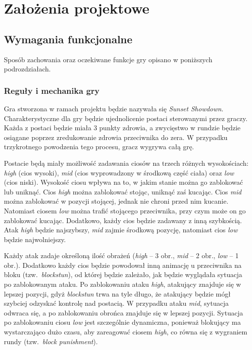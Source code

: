 \chapter{Założenia projektowe}
\section{Wymagania funkcjonalne}
Sposób zachowania oraz oczekiwane funkcje gry opisano w poniższych podrozdziałach.
\subsection{Reguły i mechanika gry}
Gra stworzona w ramach projektu będzie nazywała się \emph{Sunset Showdown}. Charakterystyczne dla gry będzie ujednolicenie postaci sterowanymi przez graczy. Każda z postaci będzie miała 3 punkty zdrowia, a zwycięstwo w rundzie będzie osiągane poprzez zredukowanie zdrowia przeciwnika do zera. W przypadku trzykrotnego powodzenia tego procesu, gracz wygrywa całą grę. 

Postacie będą miały możliwość zadawania ciosów na trzech różnych wysokościach: \emph{high} (cios wysoki), \emph{mid} (cios wyprowadzony w środkową część ciała) oraz \emph{low} (cios niski). Wysokość ciosu wpływa na to, w jakim stanie można go zablokować lub uniknąć. Cios \emph{high} można zablokować stojąc, uniknąć zaś kucając. Cios \emph{mid} można zablokować w pozycji stojącej, jednak nie chroni przed nim kucanie. Natomiast ciosem \emph{low} można trafić stojącego przeciwnika, przy czym może on go zablokować kucając. Dodatkowo, każdy cios będzie zadawany z inną szybkością. Atak \emph{high} będzie najszybszy, \emph{mid} zajmie środkową pozycję, natomiast cios \emph{low} będzie najwolniejszy. 

Każdy atak zadaje określoną ilość obrażeń (\emph{high} -- 3 obr., \emph{mid} -- 2 obr., \emph{low} -- 1 obr.). Dodatkowo każdy cios będzie powodował inną animację u przeciwnika na bloku (tzw.~\emph{blockstun}), od której będzie zależało, jak będzie wyglądała sytuacja po zablokowanym ataku. Po zablokowaniu ataku \emph{high}, atakujący znajduje się w lepszej pozycji, gdyż \emph{blockstun} trwa na tyle długo, że atakujący będzie mógł szybciej odzyskać kontrolę nad postacią. W przypadku ataku \emph{mid}, sytuacja odwraca się, a po zablokowaniu obrońca znajduje się w lepszej pozycji. Sytuacja po zablokowaniu ciosu \emph{low} jest szczególnie dynamiczna, ponieważ blokujący ma wystarczająco dużo czasu, aby zareagować ciosem \emph{high}, co równa się z wygraniem rundy (tzw.~\emph{block punishment}).

